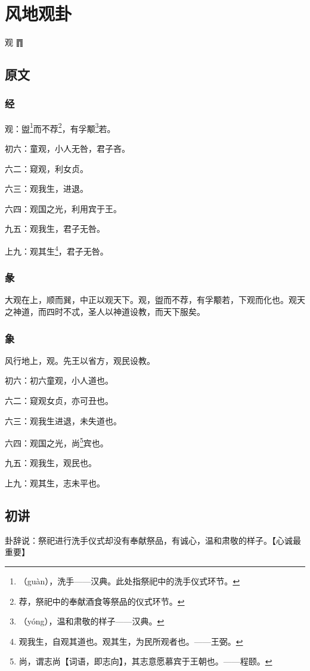 \documentclass[12pt,oneside]{book}
\begin{document}
\chapter{风地观卦}
观 {\Large ䷓}

\section{原文}

\subsection{经}
观：盥\footnote{（guàn），洗手——汉典。此处指祭祀中的洗手仪式环节。}而不荐\footnote{荐，祭祀中的奉献酒食等祭品的仪式环节。}，有孚颙\footnote{（yóng），温和肃敬的样子——汉典。}若。

初六：童观，小人无咎，君子吝。

六二：窥观，利女贞。

六三：观我生，进退。

六四：观国之光，利用宾于王。

九五：观我生，君子无咎。

上九：观其生\footnote{观我生，自观其道也。观其生，为民所观者也。——王弼。}，君子无咎。

\subsection{彖}
大观在上，顺而巽，中正以观天下。观，盥而不荐，有孚颙若，下观而化也。观天之神道，而四时不忒，圣人以神道设教，而天下服矣。

\subsection{象}
风行地上，观。先王以省方，观民设教。

初六：初六童观，小人道也。

六二：窥观女贞，亦可丑也。

六三：观我生进退，未失道也。

六四：观国之光，尚\footnote{尚，谓志尚【词语，即志向】，其志意愿慕宾于王朝也。——程颐。}宾也。

九五：观我生，观民也。

上九：观其生，志未平也。

\section{初讲}
卦辞说：祭祀进行洗手仪式却没有奉献祭品，有诚心，温和肃敬的样子。【心诚最重要】
\end{document}
